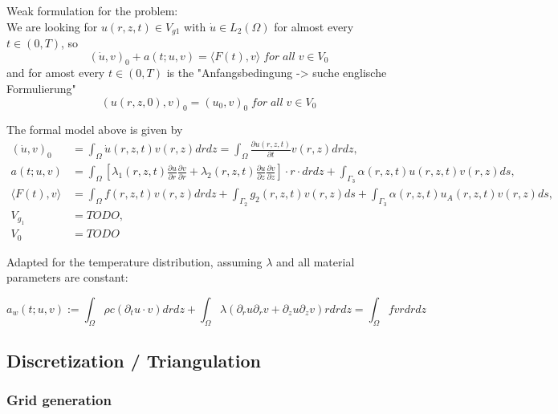 \documentclass[parskip=half, titlepage=yes, 12pt, BCOR=12mm, DIV=calc]{scrartcl}
\begin{document}
Weak formulation for the problem: \\

We are looking for $u(r,z,t) \in V_{g1}$ with $\Dot{u} \in L_2(\Omega)$ for almost every $t \in (0,T)$, so \\ \begin{equation}
(\Dot{u},v)_0 + a(t;u,v) = \langle F(t),v \rangle \; for \; all \; v \in V_0    
\end{equation}
and for amost every $t \in (0, T)$ is the "Anfangsbedingung -> suche englische Formulierung"
\begin{equation}
    (u(r,z,0),v)_0 = (u_0,v)_0 \; for \; all \; v \in V_0
\end{equation}

The formal model above is given by 
\begin{align*}
    (\Dot{u},v)_0 &= \int_{\Omega} \Dot{u}(r,z,t)v(r,z) drdz = \int_{\Omega} \frac{\partial u(r,z,t)}{\partial t} v(r,z) drdz, \\
    a(t;u,v) &= \int_{\Omega} \left[ \lambda_1(r,z,t) \frac{\partial u}{\partial r} \frac{\partial v}{\partial r} + \lambda_2(r,z,t) \frac{\partial u}{\partial z} \frac{\partial v}{\partial z} \right] \cdot r \cdot drdz + \int_{\Gamma_3} \alpha(r,z,t)u(r,z,t)v(r,z) ds, \\
    \langle F(t),v \rangle &= \int_{\Omega} f(r,z,t)v(r,z) drdz + \int_{\Gamma_2} g_2(r,z,t)v(r,z) ds + \int_{\Gamma_3} \alpha(r,z,t)u_A(r,z,t)v(r,z) ds, \\
    V_{g_1} &= TODO, \\
    V_0 &= TODO
\end{align*}

Adapted for the temperature distribution, assuming $\lambda$ and all material parameters are constant: 

\begin{equation}
    a_w(t;u,v) := \int_{\Omega} \rho c (\partial_t u \cdot v) drdz + \int_{\Omega} \lambda (\partial_r u \partial_r v + \partial_z u \partial_z v) r drdz = \int_{\Omega} f v r dr dz
\end{equation}

\newpage

\subsection{Discretization / Triangulation}

\subsubsection{Grid generation}
\end{document}
